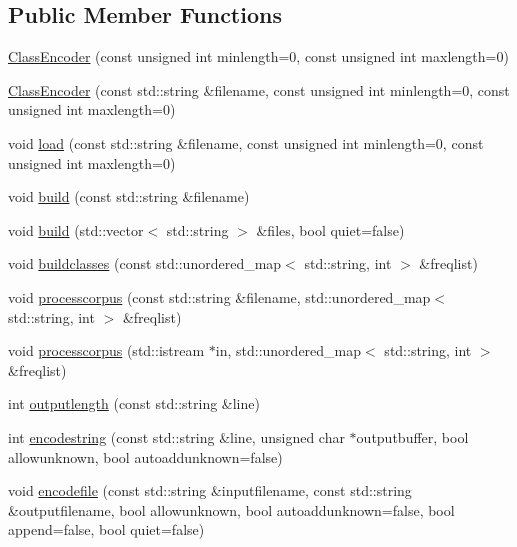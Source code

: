 \subsection*{Public Member Functions}
\begin{DoxyCompactItemize}
\item 
\hyperlink{classClassEncoder_aacc3de280c20145195eb0218b6111c0a}{Class\+Encoder} (const unsigned int minlength=0, const unsigned int maxlength=0)
\item 
\hyperlink{classClassEncoder_ad45c22282d9cdbf5bc3b63529f104a82}{Class\+Encoder} (const std\+::string \&filename, const unsigned int minlength=0, const unsigned int maxlength=0)
\item 
void \hyperlink{classClassEncoder_a154967c8f5092155daff8f8d2e9614f9}{load} (const std\+::string \&filename, const unsigned int minlength=0, const unsigned int maxlength=0)
\item 
void \hyperlink{classClassEncoder_a7a778921ee3b6c24152bd4754c095780}{build} (const std\+::string \&filename)
\item 
void \hyperlink{classClassEncoder_a63dc79113097584b052b1c1aafb1450e}{build} (std\+::vector$<$ std\+::string $>$ \&files, bool quiet=false)
\item 
void \hyperlink{classClassEncoder_a1d2503142bf80628342d63d4b1bc8c80}{buildclasses} (const std\+::unordered\+\_\+map$<$ std\+::string, int $>$ \&freqlist)
\item 
void \hyperlink{classClassEncoder_a31582938ee64039dda806490f70ede04}{processcorpus} (const std\+::string \&filename, std\+::unordered\+\_\+map$<$ std\+::string, int $>$ \&freqlist)
\item 
void \hyperlink{classClassEncoder_a51df3eebfbcf89c57deaa1a43056be34}{processcorpus} (std\+::istream $\ast$in, std\+::unordered\+\_\+map$<$ std\+::string, int $>$ \&freqlist)
\item 
int \hyperlink{classClassEncoder_a27a25d91e8e1a1412d905ae4d09ac9d5}{outputlength} (const std\+::string \&line)
\item 
int \hyperlink{classClassEncoder_af8a81b7f610ab91dc31db0c893c92321}{encodestring} (const std\+::string \&line, unsigned char $\ast$outputbuffer, bool allowunknown, bool autoaddunknown=false)
\item 
void \hyperlink{classClassEncoder_a2733c6eaab7304a53cfc63a10c3bbee3}{encodefile} (const std\+::string \&inputfilename, const std\+::string \&outputfilename, bool allowunknown, bool autoaddunknown=false, bool append=false, bool quiet=false)
\item 

\end{DoxyCompactItemize}
